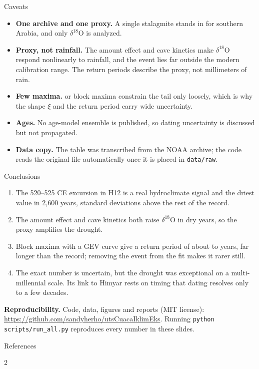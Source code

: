 \documentclass[aspectratio=169,11pt]{beamer}
\newcommand{\dO}{$\delta^{18}$O}
\begin{document}
\begin{frame}{Caveats}
  \begin{itemize}\small\setlength{\itemsep}{3pt}
    \item \textbf{One archive and one proxy.} A single stalagmite stands in
          for southern Arabia, and only \dO{} is analyzed.
    \item \textbf{Proxy, not rainfall.} The amount effect and cave kinetics
          make \dO{} respond nonlinearly to rainfall, and the event lies far
          outside the modern calibration range. The return periods describe
          the proxy, not millimeters of rain.
    \item \textbf{Few maxima.} \nNFifty{} or \nNHundred{} block maxima
          constrain the tail only loosely, which is why the shape $\xi$ and
          the return period carry wide uncertainty.
    \item \textbf{Ages.} No age-model ensemble is published, so dating
          uncertainty is discussed but not propagated.
    \item \textbf{Data copy.} The table was transcribed from the NOAA
          archive; the code reads the original file automatically once it is
          placed in \texttt{data/raw}.
  \end{itemize}
\end{frame}

\begin{frame}{Conclusions}
  \begin{enumerate}\small\setlength{\itemsep}{3pt}
    \item The 520--525 CE excursion in H12 is a real hydroclimate signal and
          the \alert{driest value in 2,600 years}, \nZscore{} standard
          deviations above the rest of the record.
    \item The amount effect and cave kinetics both raise \dO{} in dry years,
          so the proxy amplifies the drought.
    \item Block maxima with a GEV curve give a return period of about
          \alert{\nTFifty{} to \nTHundred{} years}, far longer than the
          record; removing the event from the fit makes it rarer still.
    \item The exact number is uncertain, but the drought was exceptional on
          a multi-millennial scale. Its link to Himyar rests on timing that
          dating resolves only to a few decades.
  \end{enumerate}
  \par\smallskip
  \footnotesize\textbf{Reproducibility.} Code, data, figures and reports
  (MIT license): \url{https://github.com/sandyherho/utsCuacaIklimEks}.
  Running \texttt{python scripts/run\_all.py} reproduces every number in
  these slides.
\end{frame}

\begin{frame}{References}
  \renewcommand{\bibsection}{}
  \fontsize{6.2}{7.2}\selectfont
  \begin{multicols}{2}
    
    
  \end{multicols}
\end{frame}
\end{document}

